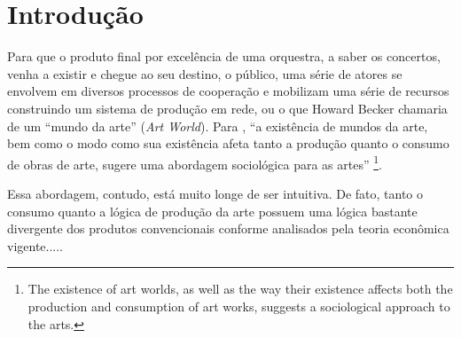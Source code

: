 \documentclass[a4paper, 12pt, openright, oneside, german, french, english, brazil]{abntex2}
\begin{document}
	\listoffigures
	\listoftables	
	\newpage
	\tableofcontents
	\textual
	
	\chapter*[Introdução]{Introdução}
	
	Para que o produto final por excelência de uma orquestra, a saber os concertos, venha a existir e chegue ao seu destino, o público, uma série de atores se envolvem em diversos processos de cooperação e mobilizam uma série de recursos construindo um sistema de produção em rede, ou o que Howard Becker chamaria de um ``mundo da arte'' (\textit{Art World}). Para , ``a existência de mundos da arte, bem como o modo como sua existência afeta tanto a produção quanto o consumo de obras de arte, sugere uma abordagem sociológica para as artes'' \footnote{The existence of art worlds, as well as the way their existence affects both the production and consumption of art works, suggests a sociological approach to the arts.}.
	
	Essa abordagem, contudo, está muito longe de ser intuitiva. De fato, tanto o consumo quanto a lógica de produção da arte possuem uma lógica bastante divergente dos produtos convencionais conforme analisados pela teoria econômica vigente.....
	
	
	
	
	
\end{document}
